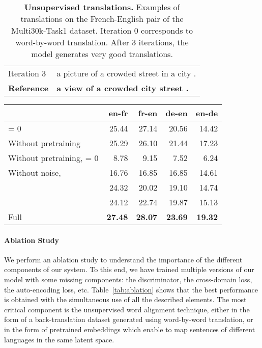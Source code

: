 \documentclass{article} \usepackage{iclr2018_conference,times}
\begin{document}
\begin{table}[bt]
\begin{center}
\begin{tabular}{ll}
    Iteration 3        & a picture of a crowded street in a city .   \\
    \textbf{Reference} & \textbf{a view of a crowded city street .}  \\
    \bottomrule
    \end{tabular}
    \smallskip
    \caption{\textbf{Unsupervised translations.} Examples of translations on the French-English pair of the Multi30k-Task1 dataset. Iteration 0 corresponds to word-by-word translation. After 3 iterations, the model generates very good translations.}
    \label{tab:examples_translation}
    \end{center}
\end{table}


\begin{table*}[t]
	\begin{center}
	\small
	\begin{tabular}[b]{lrrrr}
	\toprule
    & en-fr & fr-en & de-en & en-de \\
    \midrule
     = 0                       & 25.44 & 27.14 & 20.56 & 14.42 \\
    Without pretraining                    & 25.29 & 26.10 & 21.44 & 17.23 \\
	Without pretraining,  = 0  &  8.78 &  9.15 &  7.52 &  6.24 \\
    Without noise,                           & 16.76 & 16.85 & 16.85 & 14.61 \\
	                   & 24.32 & 20.02 & 19.10 & 14.74 \\
                        & 24.12 & 22.74 & 19.87 & 15.13 \\
    Full                                   & \textbf{27.48} & \textbf{28.07} & \textbf{23.69} & \textbf{19.32} \\
    \bottomrule
	\end{tabular}
	\caption{\textbf{Ablation study on the Multi30k-Task1 dataset}.}
	\label{tab:ablation}
	\end{center}
\end{table*}

\paragraph{Ablation Study} We perform an ablation study to understand the importance of the different components of our system. To this end, we have trained multiple versions of our model with some missing components: the discriminator, the cross-domain loss, the auto-encoding loss, etc. Table~\ref{tab:ablation} shows that the best performance is obtained with the simultaneous use of all the described elements. The most critical component is the unsupervised word alignment technique, either in the form of a back-translation dataset generated using word-by-word translation, or in the form of pretrained embeddings which enable to map sentences of different languages in the same latent space.
\end{document}
